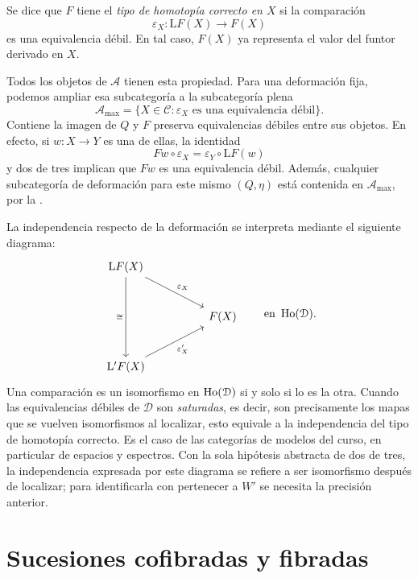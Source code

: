 \begin{defi}
Se dice que $F$ tiene el \emph{tipo de homotopía correcto en $X$} si la comparación
\[
\varepsilon_X\colon\mathrm LF(X)\longrightarrow F(X)
\]
es una equivalencia débil. En tal caso, $F(X)$ ya representa el valor del funtor derivado en $X$.
\end{defi}

Todos los objetos de $\mathcal A$ tienen esta propiedad. Para una deformación fija, podemos ampliar esa subcategoría a la subcategoría plena
\[
\mathcal A_{\max}
=\{X\in\mathcal C:\varepsilon_X\text{ es una equivalencia débil}\}.
\]
Contiene la imagen de $Q$ y $F$ preserva equivalencias débiles entre sus objetos. En efecto, si $w\colon X\to Y$ es una de ellas, la identidad
\[
Fw\circ\varepsilon_X=\varepsilon_Y\circ\mathrm LF(w)
\]
y dos de tres implican que $Fw$ es una equivalencia débil. Además, cualquier subcategoría de deformación para este mismo $(Q,\eta)$ está contenida en $\mathcal A_{\max}$, por la .

La independencia respecto de la deformación se interpreta mediante el siguiente diagrama:
\[
\begin{tikzcd}[column sep=huge,row sep=large]
\mathrm LF(X)\arrow[dr,"\varepsilon_X"]\arrow[dd,"\cong"']&\\
&F(X)\\
\mathrm L'F(X)\arrow[ur,"\varepsilon'_X"']&
\end{tikzcd}
\qquad\text{en }\Ho(\mathcal D).
\]
Una comparación es un isomorfismo en $\operatorname{Ho}(\mathcal D)$ si y solo si lo es la otra. Cuando las equivalencias débiles de $\mathcal D$ son \emph{saturadas}, es decir, son precisamente los mapas que se vuelven isomorfismos al localizar, esto equivale a la independencia del tipo de homotopía correcto. Es el caso de las categorías de modelos del curso, en particular de espacios y espectros. Con la sola hipótesis abstracta de dos de tres, la independencia expresada por este diagrama se refiere a ser isomorfismo después de localizar; para identificarla con pertenecer a $W'$ se necesita la precisión anterior.

\section{Sucesiones cofibradas y fibradas}

